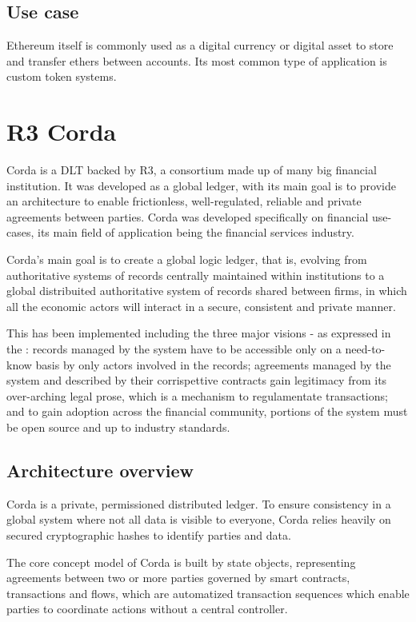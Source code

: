 \subsection{Use case}

Ethereum itself is commonly used as a digital currency or digital asset to store and transfer ethers between accounts. Its most common type of application is custom token systems. 

\section{R3 Corda}

Corda is a DLT backed by R3, a consortium made up of many big financial institution. It was developed as a global ledger, with its main goal is to provide an architecture to enable frictionless, well-regulated, reliable and private agreements between parties. Corda was developed specifically on financial use-cases, its main field of application being the financial services industry.

Corda's main goal is to create a global logic ledger, that is, evolving from authoritative systems of records centrally maintained within institutions to a global distribuited authoritative system of records shared between firms, in which all the economic actors will interact in a secure, consistent and private manner.

This has been implemented including the three major visions - as expressed in the \cite{cordawhitepaper}: records managed by the system have to be accessible only on a need-to-know basis by only actors involved in the records; agreements managed by the system and described by their corrispettive contracts gain legitimacy from its over-arching legal prose, which is a mechanism to regulamentate transactions; and to gain adoption across the financial community, portions of the system must be open source and up to industry standards.

\subsection{Architecture overview}

Corda is a private, permissioned distributed ledger. To ensure consistency in a global system where not all data is visible to everyone, Corda relies heavily on secured cryptographic hashes to identify parties and data. 

The core concept model of Corda is built by state objects, representing agreements between two or more parties governed by smart contracts, transactions and flows, which are automatized transaction sequences which enable parties to coordinate actions without a central controller.

